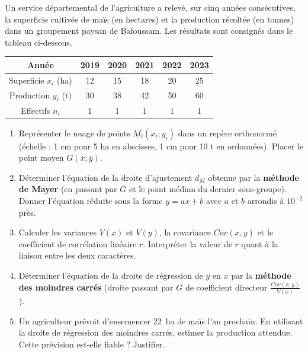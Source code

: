 \documentclass[11pt]{article}
\begin{document}
\begin{exercice}
Un service départemental de l'agriculture a relevé, sur cinq années consécutives, la superficie cultivée de maïs (en hectares) et la production récoltée (en tonnes) dans un groupement paysan de Bafoussam. Les résultats sont consignés dans le tableau ci-dessous.

\begin{center}
\begin{tabular}{|c|c|c|c|c|c|}
\hline
Année & 2019 & 2020 & 2021 & 2022 & 2023 \\
\hline
Superficie $x_i$ (ha) & 12 & 15 & 18 & 20 & 25 \\
\hline
Production $y_i$ (t) & 30 & 38 & 42 & 50 & 60 \\
\hline
Effectifs $n_i$ & 1 & 1 & 1 & 1 & 1 \\
\hline
\end{tabular}
\end{center}

\begin{enumerate}
    \item Représenter le nuage de points $M_i(x_i ; y_i)$ dans un repère orthonormé (échelle : 1 cm pour 5 ha en abscisses, 1 cm pour 10 t en ordonnées). Placer le point moyen $G(\bar{x} ; \bar{y})$.
    \item Déterminer l'équation de la droite d'ajustement $d_M$ obtenue par la \textbf{méthode de Mayer} (en passant par $G$ et le point médian du dernier sous-groupe). Donner l'équation réduite sous la forme $y = ax + b$ avec $a$ et $b$ arrondis à $10^{-2}$ près.
    \item Calculer les variances $V(x)$ et $V(y)$, la covariance $Cov(x,y)$ et le coefficient de corrélation linéaire $r$. Interpréter la valeur de $r$ quant à la liaison entre les deux caractères.
    \item Déterminer l'équation de la droite de régression de $y$ en $x$ par la \textbf{méthode des moindres carrés} (droite passant par $G$ de coefficient directeur $\frac{Cov(x,y)}{V(x)}$).
    \item Un agriculteur prévoit d'ensemencer \SI{22}{\hectare} de maïs l'an prochain. En utilisant la droite de régression des moindres carrés, estimer la production attendue. Cette prévision est-elle fiable ? Justifier.
\end{enumerate}
\end{exercice}
\end{document}
